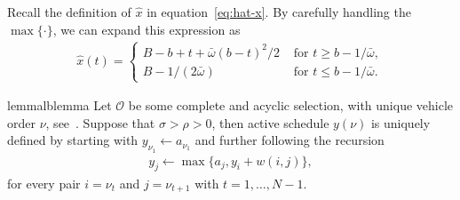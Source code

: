 \documentclass[a4paper]{report}
\theoremstyle{definition}
\theoremstyle{plain}
\newcommand\note[1]{{\color{Navy}\noindent#1}}
\begin{document}
\note{
Recall the definition of $\hat{x}$ in equation~\eqref{eq:hat-x}. By carefully
handling the $\max\{\cdot\}$, we can expand this expression as
\begin{align}
  \hat{x}(t) =
  \begin{cases}
    B - b + t + \bar{\omega} (b-t)^{2} / 2 &\text{ for } t \geq b - 1/\bar{\omega} , \\
    B - 1/(2\bar{\omega}) &\text{ for } t \leq b - 1/\bar{\omega} .
  \end{cases}
\end{align}
}

\newpage

\begin{restatable}{lemma}{lblemma}\label{lemma:lb-computation}
  Let $\mathcal{O}$ be some complete and acyclic selection, with unique vehicle
  order $\nu$, see~. Suppose that $\sigma > \rho > 0$,
  then active schedule $y(\nu)$ is uniquely defined by starting with
  $y_{\nu_1} \leftarrow a_{\nu_1}$ and further following the recursion
\begin{align}
  \label{eq:lb-computation}
  y_{j} \leftarrow \max \{ a_{j}, y_i + w(i, j) \} ,
\end{align}
for every pair $i = \nu_t$ and $j = \nu_{t+1}$ with $t = 1, \dots, N-1$.
\end{restatable}
\end{document}
